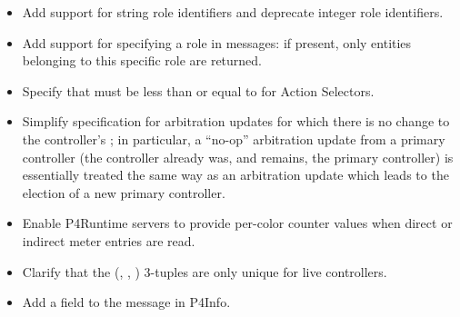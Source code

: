 \documentclass[11pt]{article}
\begin{document}
{\begin{itemize}[noitemsep,topsep=\mdcompacttopsep]
\item{}Add support for string role identifiers and deprecate integer role
identifiers.%

\item{}Add support for specifying a role in  messages: if present, only
entities belonging to this specific role are returned.%

\item{}Specify that  must be less than or equal to  for Action
Selectors.%

\item{}Simplify specification for arbitration updates for which there is no change to
the controller's ; in particular, a \textquotedblleft{}no-op\textquotedblright{} arbitration update
from a primary controller (the controller already was, and remains, the
primary controller) is essentially treated the same way as an arbitration
update which leads to the election of a new primary controller.%

\item{}Enable P4Runtime servers to provide per-color counter values when direct or
indirect meter entries are read.%

\item{}Clarify that the (, , ) 3-tuples are only unique
for live controllers.%

\item{}Add a  field to the  message in P4Info.%
\end{itemize}%

}
\end{document}
